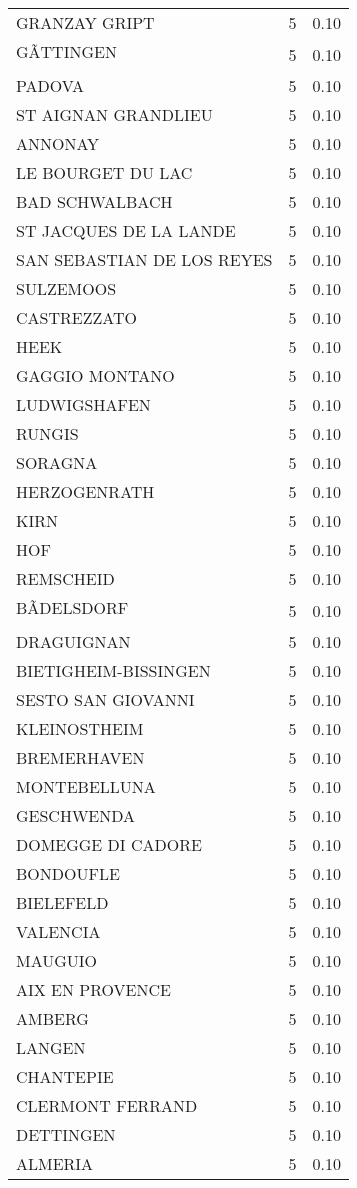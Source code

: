 \begin{table*}[htbp]
\begin{tabular}{lrr}
GRANZAY GRIPT & 5 & 0.10 \\
GÃTTINGEN & 5 & 0.10 \\
PADOVA & 5 & 0.10 \\
ST AIGNAN GRANDLIEU & 5 & 0.10 \\
ANNONAY & 5 & 0.10 \\
LE BOURGET DU LAC & 5 & 0.10 \\
BAD SCHWALBACH & 5 & 0.10 \\
ST JACQUES DE LA LANDE & 5 & 0.10 \\
SAN SEBASTIAN DE LOS REYES & 5 & 0.10 \\
SULZEMOOS & 5 & 0.10 \\
CASTREZZATO & 5 & 0.10 \\
HEEK & 5 & 0.10 \\
GAGGIO MONTANO & 5 & 0.10 \\
LUDWIGSHAFEN & 5 & 0.10 \\
RUNGIS & 5 & 0.10 \\
SORAGNA & 5 & 0.10 \\
HERZOGENRATH & 5 & 0.10 \\
KIRN & 5 & 0.10 \\
HOF & 5 & 0.10 \\
REMSCHEID & 5 & 0.10 \\
BÃDELSDORF & 5 & 0.10 \\
DRAGUIGNAN & 5 & 0.10 \\
BIETIGHEIM-BISSINGEN & 5 & 0.10 \\
SESTO SAN GIOVANNI & 5 & 0.10 \\
KLEINOSTHEIM & 5 & 0.10 \\
BREMERHAVEN & 5 & 0.10 \\
MONTEBELLUNA & 5 & 0.10 \\
GESCHWENDA & 5 & 0.10 \\
DOMEGGE DI CADORE & 5 & 0.10 \\
BONDOUFLE & 5 & 0.10 \\
BIELEFELD & 5 & 0.10 \\
VALENCIA & 5 & 0.10 \\
MAUGUIO & 5 & 0.10 \\
AIX EN PROVENCE & 5 & 0.10 \\
AMBERG & 5 & 0.10 \\
LANGEN & 5 & 0.10 \\
CHANTEPIE & 5 & 0.10 \\
CLERMONT FERRAND & 5 & 0.10 \\
DETTINGEN & 5 & 0.10 \\
ALMERIA & 5 & 0.10 \\

\end{tabular}
\end{table*}

